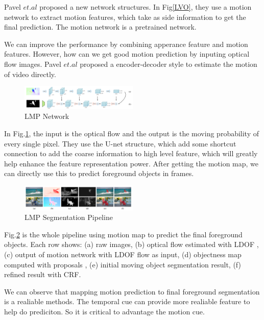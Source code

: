 Pavel $et.al$\cite{Tokmakov2017Learning} proposed a new network structures. In Fig\ref{LVO}, they use a motion network to extract motion features, which 
take as side information to get the final prediction. The motion network is a pretrained network.

We can improve the performance by combining apperance feature and motion features. However, how can we get good motion
prediction by inputing optical flow images. Pavel $et.al$\cite{LMPV} proposed a encoder-decoder style to estimate the motion 
of video directly.

\begin{figure}[ht]
    \centering
    \includegraphics[width=0.5\textwidth]{./figure/LMP_NET.png}
    \caption{LMP Network}
    \label{LMP}
\end{figure}

In Fig.\ref{LMP}, the input is the optical flow and the output is the moving probability of every single pixel. They use the U-net structure, which
add some shortcut connection to add the coarse information to high level feature, which will greatly help enhance the feature representation power.
After getting the motion map, we can directly use this to predict foreground objects in frames. 

\begin{figure}[ht]
    \centering
    \includegraphics[width=0.5\textwidth]{./figure/LMP_results.png}
    \caption{LMP Segmentation Pipeline}
    \label{LMP_results}
\end{figure}

Fig.\ref{LMP_results} is the whole pipeline using motion map to predict the final foreground objects. Each row shows: (a) raw images,
(b) optical flow estimated with LDOF \cite{brox2009large}, (c) output of motion network with LDOF flow as input, (d) objectness map computed with
proposals \cite{pinheiro2016learning}, (e) initial moving object segmentation result, (f) refined result with CRF.

We can observe that mapping motion prediction to final foreground segmentation is a realiable methods. The temporal cue can provide more realiable
feature to help do prediciton. So it is critical to advantage the motion cue.


